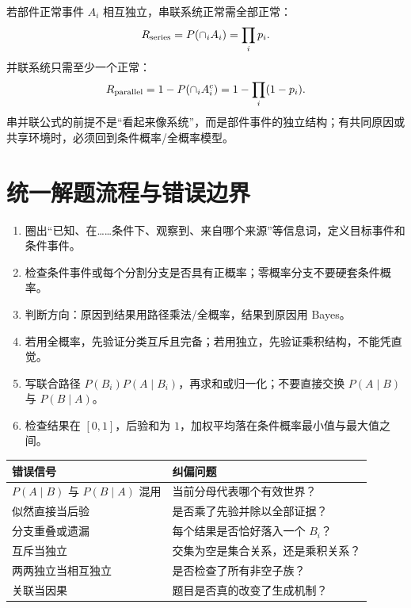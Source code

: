 \documentclass[11pt,a4paper]{ctexart}
\begin{document}
若部件正常事件 $A_i$ 相互独立，串联系统正常需全部正常：
\[
R_{\rm series}=P(\cap_iA_i)=\prod_ip_i.
\]
并联系统只需至少一个正常：
\[
R_{\rm parallel}=1-P(\cap_iA_i^c)=1-\prod_i(1-p_i).
\]
串并联公式的前提不是“看起来像系统”，而是部件事件的独立结构；有共同原因或共享环境时，必须回到条件概率/全概率模型。

\section{统一解题流程与错误边界}

\begin{enumerate}
\item 圈出“已知、在……条件下、观察到、来自哪个来源”等信息词，定义目标事件和条件事件。
\item 检查条件事件或每个分割分支是否具有正概率；零概率分支不要硬套条件概率。
\item 判断方向：原因到结果用路径乘法/全概率，结果到原因用 Bayes。
\item 若用全概率，先验证分类互斥且完备；若用独立，先验证乘积结构，不能凭直觉。
\item 写联合路径 $P(B_i)P(A\mid B_i)$，再求和或归一化；不要直接交换 $P(A\mid B)$ 与 $P(B\mid A)$。
\item 检查结果在 $[0,1]$，后验和为 $1$，加权平均落在条件概率最小值与最大值之间。
\end{enumerate}

\begin{center}
\begin{tabularx}{\linewidth}{L{4.2cm}Y}
\toprule
错误信号 & 纠偏问题 \\
\midrule
$P(A\mid B)$ 与 $P(B\mid A)$ 混用 & 当前分母代表哪个有效世界？ \\
似然直接当后验 & 是否乘了先验并除以全部证据？ \\
分支重叠或遗漏 & 每个结果是否恰好落入一个 $B_i$？ \\
互斥当独立 & 交集为空是集合关系，还是乘积关系？ \\
两两独立当相互独立 & 是否检查了所有非空子族？ \\
关联当因果 & 题目是否真的改变了生成机制？ \\
\bottomrule
\end{tabularx}
\end{center}
\end{document}
